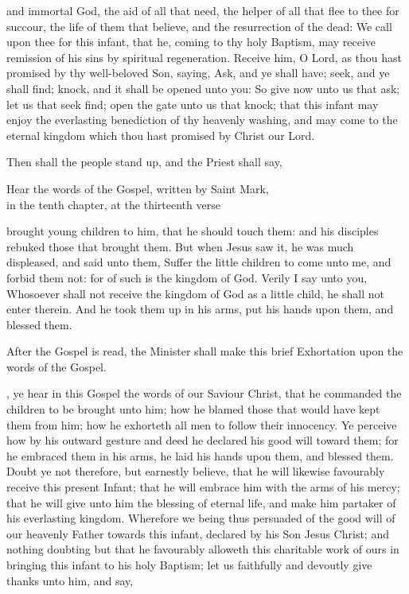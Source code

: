  and immortal God, the aid of all that need, the helper of all that flee to thee for succour, the life of them that believe, and the resurrection of the dead: We call upon thee for this infant, that he, coming to thy holy Baptism, may receive remission of his sins by spiritual regeneration.
Receive him, O Lord, as thou hast promised by thy well-beloved Son, saying, Ask, and ye shall have; seek, and ye shall find; knock, and it shall be opened unto you: So give now unto us that ask; let us that seek find; open the gate unto us that knock; that this infant may enjoy the everlasting benediction of thy heavenly washing, and may come to the eternal kingdom which thou hast promised by Christ our Lord.

\begin{rubric}
Then shall the people stand up, and the Priest shall say,
\end{rubric}

\begin{center}
Hear the words of the Gospel, written by Saint Mark,\\
in the tenth chapter, at the thirteenth verse
\end{center}

 brought young children to him, that he should touch them: and his disciples rebuked those that brought them.
But when Jesus saw it, he was much displeased, and said unto them, Suffer the little children to come unto me, and forbid them not: for of such is the kingdom of God.
Verily I say unto you, Whosoever shall not receive the kingdom of God as a little child, he shall not enter therein.
And he took them up in his arms, put his hands upon them, and blessed them.

\begin{rubric}
After the Gospel is read, the Minister shall make this brief Exhortation upon the words of the Gospel.
\end{rubric}

, ye hear in this Gospel the words of our Saviour Christ, that he commanded the children to be brought unto him; how he blamed those that would have kept them from him; how he exhorteth all men to follow their innocency.
Ye perceive how by his outward gesture and deed he declared his good will toward them; for he embraced them in his arms, he laid his hands upon them, and blessed them.
Doubt ye not therefore, but earnestly believe, that he will likewise favourably receive this present Infant; that he will embrace him with the arms of his mercy; that he will give unto him the blessing of eternal life, and make him partaker of his everlasting kingdom.
Wherefore we being thus persuaded of the good will of our heavenly Father towards this infant, declared by his Son Jesus Christ; and nothing doubting but that he favourably alloweth this charitable work of ours in bringing this infant to his holy Baptism; let us faithfully and devoutly give thanks unto him, and say,


